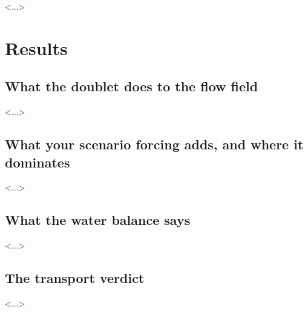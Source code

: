 \documentclass[11pt,a4paper]{article}
\begin{document}
<...>

\section{Results}
%
%
%
%

\subsection{What the doublet does to the flow field}
<...>

\subsection{What your scenario forcing adds, and where it dominates}
<...>

\subsection{What the water balance says}
<...>

\subsection{The transport verdict}
<...>

\end{document}
